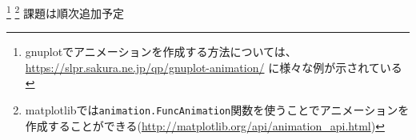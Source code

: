 \documentclass[11pt]{jarticle}
\begin{document}
\begin{enumerate}


  



\end{enumerate}  

\renewcommand{\thefootnote}{\fnsymbol{footnote}}
\footnote[0]{gnuplotでアニメーションを作成する方法については、\url{https://slpr.sakura.ne.jp/qp/gnuplot-animation/} に様々な例が示されている}
\footnote[0]{matplotlibでは\texttt{animation.FuncAnimation}関数を使うことでアニメーションを作成することができる(\url{http://matplotlib.org/api/animation_api.html})}
\noindent
課題は順次追加予定 \\[-0.5em]
\end{document}
